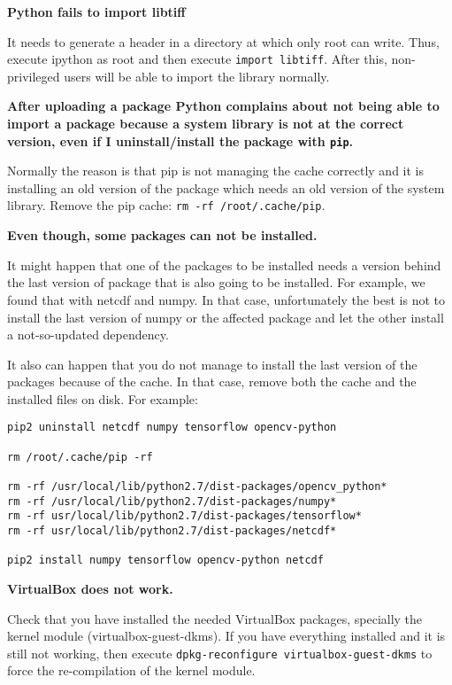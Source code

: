 \documentclass[a4paper,12pt]{article}
\begin{document}
\textbf{Python fails to import libtiff}

It needs to generate a header in a directory at which only root can write. Thus, execute ipython as root and then execute {\tt import libtiff}. After this, non-privileged users will be able to import the library normally.
\vspace{0.5cm}

\textbf{After uploading a package Python complains about not being able to import a package because a system library is not at the correct version, even if I uninstall/install the package with {\tt pip}.}

Normally the reason is that pip is not managing the cache correctly and it is installing an old version of the package which needs an old version of the system library. Remove the pip cache: {\tt rm -rf /root/.cache/pip}.
\vspace{0.5cm}

\textbf{Even though, some packages can not be installed.}

It might happen that one of the packages to be installed needs a version behind the last version of package that is also going to be installed. For example, we found that with netcdf and numpy. In that case, unfortunately the best is not to install the last version of numpy or the affected package and let the other install a not-so-updated dependency.

It also can happen that you do not manage to install the last version of the packages because of the cache. In that case, remove both the cache and the installed files on disk. For example:

\begin{verbatim}
pip2 uninstall netcdf numpy tensorflow opencv-python

rm /root/.cache/pip -rf

rm -rf /usr/local/lib/python2.7/dist-packages/opencv_python*
rm -rf /usr/local/lib/python2.7/dist-packages/numpy*
rm -rf usr/local/lib/python2.7/dist-packages/tensorflow*
rm -rf usr/local/lib/python2.7/dist-packages/netcdf*

pip2 install numpy tensorflow opencv-python netcdf
\end{verbatim}
\vspace{0.5cm}

\textbf{VirtualBox does not work.}

Check that you have installed the needed VirtualBox packages, specially the kernel module (virtualbox-guest-dkms).
If you have everything installed and it is still not working, then execute {\tt dpkg-reconfigure virtualbox-guest-dkms} to force the re-compilation of the kernel module.
\end{document}
